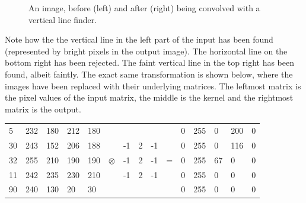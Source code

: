 \begin{figure}[h!]%
    \centering
    \qquad \qquad
    \caption{An image, before (left) and after (right) being convolved with a vertical line finder.}%
    \label{fig:input_output_simple_filter}%
\end{figure}

Note how the the vertical line in the left part of the input has been found (represented by bright pixels in the output image). The horizontal line on the bottom right has been rejected. The faint vertical line in the top right has been found, albeit faintly. The exact same transformation is shown below, where the images have been replaced with their underlying matrices. The leftmost matrix is the pixel values of the input matrix, the middle is the kernel and the rightmost matrix is the output. \\

\begin{table}[h!]
	\centering
	\begin{tabular}{ p{0.5cm} p{0.5cm} p{0.5cm} p{0.5cm} p{0.5cm} p{0.5cm} p{0.5cm} p{0.5cm} p{0.5cm} p{0.5cm} p{0.5cm} p{0.5cm} p{0.5cm} p{0.5cm} p{0.5cm}}
 5 & 232 & 180 & 212 & 180 &           &    &   &    &   & 0 & 255 & 0 & 200 & 0 \\
30 & 243 & 152 & 206 & 188 &           & -1 & 2 & -1 &   & 0 & 255 & 0 & 116 & 0 \\
32 & 255 & 210 & 190 & 190 & $\otimes$ & -1 & 2 & -1 & = & 0 & 255 & 67 & 0  & 0 \\
11 & 242 & 235 & 230 & 210 &           & -1 & 2 & -1 &   & 0 & 255 & 0 &  0  & 0 \\
90 & 240 & 130 &  20 &  30 &           &    &   &    &   & 0 & 255 & 0 &  0  & 0
	\end{tabular}
\end{table}

